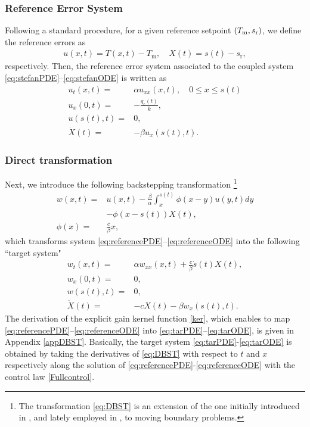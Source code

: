 \documentclass[journal]{IEEEtran}
\begin{document}
\subsubsection{Reference Error System}
Following  a standard procedure, for  a given reference setpoint $(T_{\rm m}, s_{{\mathrm r}})$, we define the reference errors as 
\begin{align}
u(x,t)=T(x,t)-T_{{\mathrm m}}, \quad X(t)=s(t)-s_{{\mathrm r}}, 
\end{align}
respectively. Then, the reference error system associated to the coupled system \eqref{eq:stefanPDE}--\eqref{eq:stefanODE} is written as
\begin{align}\label{eq:referencePDE}
u_{t}(x,t) =& \alpha u_{xx}(x,t), \quad 0\leq x\leq s(t)\\
 \label{eq:referenceBC1}u_x(0,t) =& -\frac{q_{{\mathrm c}}(t)}{k},\\
 \label{eq:referenceBC2}u(s(t),t) =&0,\\
\label{eq:referenceODE}\dot{X}(t) =&-\beta u_x(s(t),t).
\end{align}

\subsubsection{Direct transformation}
Next, we introduce the following backstepping transformation \footnote{The transformation \eqref{eq:DBST} is an extension of the one initially introduced in \cite{krstic09}, and lately employed in  \cite{susto10, tang11},  to moving boundary problems. }  
\begin{align}\label{eq:DBST}
w(x,t)=&u(x,t)-\frac{\beta}{\alpha} \int_{x}^{s(t)} \phi(x-y)u(y,t) dy\nonumber\\
&-\phi(x-s(t)) X(t), \\
\phi(x) =& \frac{c}{\beta}x\label{ker}, 
\end{align}
which transforms system \eqref{eq:referencePDE}--\eqref{eq:referenceODE} into the following ``target system"
\begin{align}\label{eq:tarPDE}
w_t(x,t)=&\alpha w_{xx}(x,t)+\frac{c}{\beta}\dot{s}(t) X(t), \\
\label{eq:tarBC2}
w_x(0,t) =& 0, \\
\label{eq:tarBC1}
w(s(t),t) =& 0, \\
\label{eq:tarODE}
\dot{X}(t)=&-cX(t)-\beta w_x(s(t),t). 
\end{align}
 The derivation of the explicit gain kernel function \eqref{ker}, which enables to map \eqref{eq:referencePDE}--\eqref{eq:referenceODE} into \eqref{eq:tarPDE}--\eqref{eq:tarODE}, is given in Appendix \ref{appDBST}. Basically, the target system \eqref{eq:tarPDE}-\eqref{eq:tarODE} is obtained by taking the derivatives of \eqref {eq:DBST} with respect to $t$ and $x$ respectively along the solution of \eqref{eq:referencePDE}-\eqref{eq:referenceODE} with the control law \eqref{Fullcontrol}.
\end{document}
